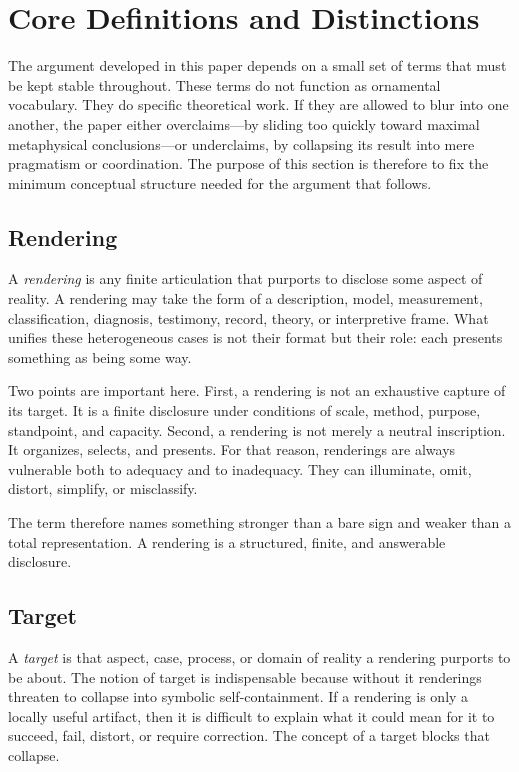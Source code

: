 \documentclass[11pt]{article}
\renewcommand{\emph}[1]{\textit{#1}}
\begin{document}
\section{Core Definitions and Distinctions}

The argument developed in this paper depends on a small set of terms that must be kept stable throughout. These terms do not function as ornamental vocabulary. They do specific theoretical work. If they are allowed to blur into one another, the paper either overclaims---by sliding too quickly toward maximal metaphysical conclusions---or underclaims, by collapsing its result into mere pragmatism or coordination. The purpose of this section is therefore to fix the minimum conceptual structure needed for the argument that follows.

\subsection{Rendering}

A \emph{rendering} is any finite articulation that purports to disclose some aspect of reality. A rendering may take the form of a description, model, measurement, classification, diagnosis, testimony, record, theory, or interpretive frame. What unifies these heterogeneous cases is not their format but their role: each presents something as being some way.

Two points are important here. First, a rendering is not an exhaustive capture of its target. It is a finite disclosure under conditions of scale, method, purpose, standpoint, and capacity. Second, a rendering is not merely a neutral inscription. It organizes, selects, and presents. For that reason, renderings are always vulnerable both to adequacy and to inadequacy. They can illuminate, omit, distort, simplify, or misclassify.

The term therefore names something stronger than a bare sign and weaker than a total representation. A rendering is a structured, finite, and answerable disclosure.

\subsection{Target}

A \emph{target} is that aspect, case, process, or domain of reality a rendering purports to be about. The notion of target is indispensable because without it renderings threaten to collapse into symbolic self-containment. If a rendering is only a locally useful artifact, then it is difficult to explain what it could mean for it to succeed, fail, distort, or require correction. The concept of a target blocks that collapse.
\end{document}
